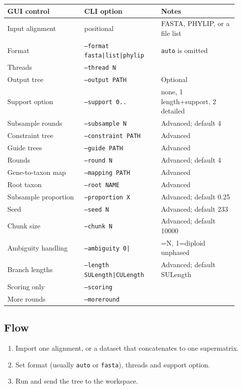 \documentclass[11pt]{report}
\begin{document}
{\footnotesize
\begin{longtable}{@{}>{\raggedright\arraybackslash}p{0.31\linewidth}>{\raggedright\arraybackslash}p{0.31\linewidth}>{\raggedright\arraybackslash}p{0.31\linewidth}@{}}
\toprule
GUI control & CLI option & Notes \\
\midrule
\endhead
Input alignment & positional & FASTA, PHYLIP, or a file list \\
Format & \texttt{--format fasta|\allowbreak list|\allowbreak phylip} & \texttt{auto} is omitted \\
Threads & \texttt{--thread N} &  \\
Output tree & \texttt{--output PATH} & Optional \\
Support option & \texttt{--support 0.\allowbreak .\allowbreak 2} & 0 none, 1 length+support, 2 detailed \\
Subsample rounds & \texttt{--subsample N} & Advanced; default 4 \\
Constraint tree & \texttt{--constraint PATH} & Advanced \\
Guide trees & \texttt{--guide PATH} & Advanced \\
Rounds & \texttt{--round N} & Advanced; default 4 \\
Gene-to-taxon map & \texttt{--mapping PATH} & Advanced \\
Root taxon & \texttt{--root NAME} & Advanced \\
Subsample proportion & \texttt{--proportion X} & Advanced; default 0.25 \\
Seed & \texttt{--seed N} & Advanced; default 233 \\
Chunk size & \texttt{--chunk N} & Advanced; default 10000 \\
Ambiguity handling & \texttt{--ambiguity 0|\allowbreak 1} & 0=N, 1=diploid unphased \\
Branch lengths & \texttt{--length SULength|\allowbreak CULength} & Advanced; default SULength \\
Scoring only & \texttt{--scoring} &  \\
More rounds & \texttt{--moreround} &  \\
\bottomrule
\end{longtable}
}

\subsection{Flow}

\begin{enumerate}
  \item Import one alignment, or a dataset that concatenates to one supermatrix.
  \item Set format (usually \texttt{auto} or \texttt{fasta}), threads and support option.
  \item Run and send the tree to the workspace.
\end{enumerate}
\end{document}
